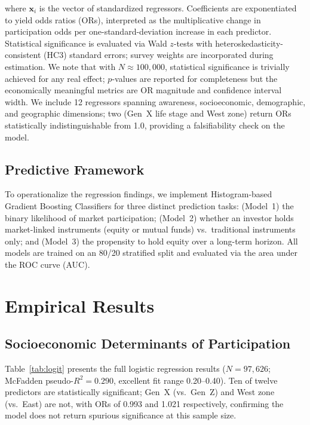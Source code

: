 \documentclass[conference]{IEEEtran}
\begin{document}
\noindent where $\mathbf{x}_i$ is the vector of standardized regressors. Coefficients are exponentiated to yield odds ratios (ORs), interpreted as the multiplicative change in participation odds per one-standard-deviation increase in each predictor. Statistical significance is evaluated via Wald $z$-tests with heteroskedasticity-consistent (HC3) standard errors; survey weights are incorporated during estimation. We note that with $N \approx 100{,}000$, statistical significance is trivially achieved for any real effect; $p$-values are reported for completeness but the economically meaningful metrics are OR magnitude and confidence interval width. We include 12 regressors spanning awareness, socioeconomic, demographic, and geographic dimensions; two (Gen~X life stage and West zone) return ORs statistically indistinguishable from 1.0, providing a falsifiability check on the model.

\subsection{Predictive Framework}
To operationalize the regression findings, we implement Histogram-based Gradient Boosting Classifiers for three distinct prediction tasks: (Model~1) the binary likelihood of market participation; (Model~2) whether an investor holds market-linked instruments (equity or mutual funds) vs.\ traditional instruments only; and (Model~3) the propensity to hold equity over a long-term horizon. All models are trained on an 80/20 stratified split and evaluated via the area under the ROC curve (AUC).

\section{Empirical Results}
\subsection{Socioeconomic Determinants of Participation}\label{sec:results}
Table~\ref{tab:logit} presents the full logistic regression results ($N = 97{,}626$; McFadden pseudo-$R^2 = 0.290$, excellent fit range 0.20--0.40). Ten of twelve predictors are statistically significant; Gen~X (vs.\ Gen~Z) and West zone (vs.\ East) are not, with ORs of 0.993 and 1.021 respectively, confirming the model does not return spurious significance at this sample size.
\end{document}
